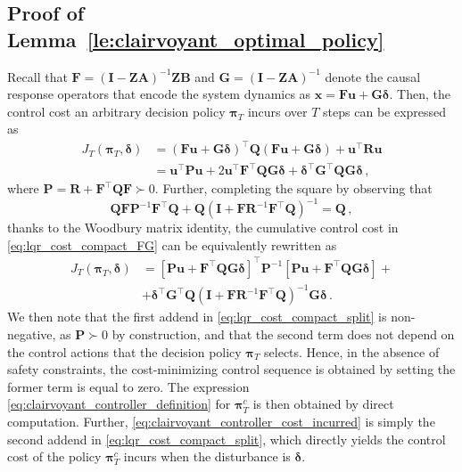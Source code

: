 \documentclass[conference]{IEEEtran}
\begin{document}
\subsection{Proof of Lemma~\ref{le:clairvoyant_optimal_policy}}
Recall that $\mathbf{F} = (\mathbf{I} - \mathbf{Z} \mathbf{A})^{-1} \mathbf{Z} \mathbf{B}$ and $\mathbf{G} = (\mathbf{I} - \mathbf{Z} \mathbf{A})^{-1}$ denote the causal response operators that encode the system dynamics as $\mathbf{x} = \mathbf{F}\mathbf{u} + \mathbf{G} \bm{\delta}$. Then, the control cost an arbitrary decision policy $\bm{\pi}_T$ incurs over $T$ steps can be expressed as
\begin{align}
    J_T(\bm{\pi}_T, \bm{\delta})
    &= \left(\mathbf{F} \mathbf{u} + \mathbf{G} \bm{\delta} \right)^\top \mathbf{Q} \left(\mathbf{F} \mathbf{u} + \mathbf{G} \bm{\delta} \right) + \mathbf{u}^\top \mathbf{R} \mathbf{u} \nonumber\\
    &= \mathbf{u}^\top \mathbf{P} \mathbf{u} + 2 \mathbf{u}^\top \mathbf{F}^\top \mathbf{Q} \mathbf{G} \bm{\delta} + \bm{\delta}^\top \mathbf{G}^\top \mathbf{Q} \mathbf{G} \bm{\delta} \label{eq:lqr_cost_compact_FG}\,,
\end{align}
where $\mathbf{P} = \mathbf{R} + \mathbf{F}^\top \mathbf{Q}\mathbf{F} \succ 0$. Further, completing the square by observing that
\begin{equation*}
    \mathbf{Q}\mathbf{F}\mathbf{P}^{-1}\mathbf{F}^\top \mathbf{Q} + \mathbf{Q}(\mathbf{I} + \mathbf{F}\mathbf{R}^{-1}\mathbf{F}^\top\mathbf{Q})^{-1} = \mathbf{Q}\,,
\end{equation*}
thanks to the Woodbury matrix identity, the cumulative control cost in \eqref{eq:lqr_cost_compact_FG} can be equivalently rewritten as
\begin{align}
    J_T(\bm{\pi}_T, \bm{\delta}) &= [\mathbf{P}\mathbf{u} + \mathbf{F}^\top \mathbf{Q} \mathbf{G} \bm{\delta}]^\top
    \mathbf{P}^{-1}
    [\mathbf{P}\mathbf{u} + \mathbf{F}^\top \mathbf{Q} \mathbf{G} \bm{\delta}] + \nonumber\\
    &+ \bm{\delta}^\top \mathbf{G}^\top \mathbf{Q} (\mathbf{I} + \mathbf{F}\mathbf{R}^{-1}\mathbf{F}^\top \mathbf{Q})^{-1} \mathbf{G} \bm{\delta}\label{eq:lqr_cost_compact_split}\,.
\end{align}
We then note that the first addend in \eqref{eq:lqr_cost_compact_split} is non-negative, as $\mathbf{P} \succ 0$ by construction, and that the second term does not depend on the control actions that the decision policy $\bm{\pi}_T$ selects. Hence, in the absence of safety constraints, the cost-minimizing control sequence is obtained by setting the former term is equal to zero. The expression \eqref{eq:clairvoyant_controller_definition} for $\bm{\pi}^c_T$ is then obtained by direct computation. Further, \eqref{eq:clairvoyant_controller_cost_incurred} is simply the second addend in \eqref{eq:lqr_cost_compact_split}, which directly yields the control cost of the policy $\bm{\pi}^c_T$ incurs when the disturbance is $\bm{\delta}$.
\end{document}
